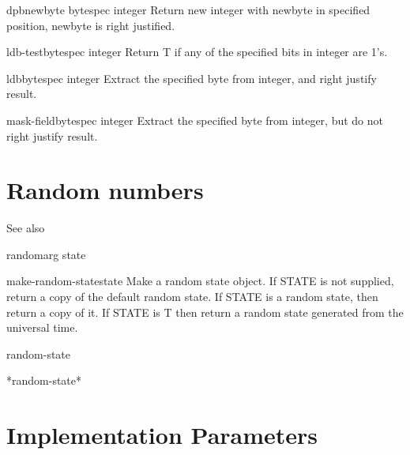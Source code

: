 \documentclass[10pt,english]{book}
\begin{document}
\begin{function}{dpb}{newbyte bytespec integer}
  Return new integer with newbyte in specified position, newbyte is right justified.
\end{function}

\begin{function}{ldb-test}{bytespec integer}
  Return T if any of the specified bits in integer are 1's.
\end{function}

\begin{accessor}{ldb}{bytespec integer}
  Extract the specified byte from integer, and right justify result.
\end{accessor}

\begin{accessor}{mask-field}{bytespec integer}
  Extract the specified byte from integer,  but do not right justify result.
\end{accessor}

\section{Random numbers}
\label{sec:random-numbers}

See also 

\begin{function}{random}{arg \op state}
  
\end{function}

\begin{function}{make-random-state}{\op state}
  Make a random state object. If STATE is not supplied, return a copy
  of the default random state. If STATE is a random state, then return a
  copy of it. If STATE is T then return a random state generated from
  the universal time.
\end{function}

\begin{class}{random-state}{}
  
\end{class}

\begin{variable}{*random-state*}{}
  
\end{variable}

\section{Implementation Parameters}
\label{sec:impl-param}
\end{document}
